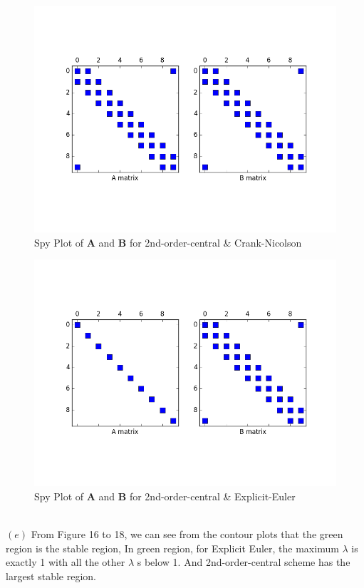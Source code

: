 \documentclass[12pt]{article}
\newenvironment{problem}[2][Problem]{\begin{trivlist}
\item[\hskip \labelsep {\bfseries #1}\hskip \labelsep {\bfseries #2.}]}{\end{trivlist}}
\begin{document}
\begin{problem}{2}
\begin{figure}[H]
  \includegraphics[scale=0.5]{p2d_c2nd_cn.png}
 \caption{Spy Plot of $\mathbf{A}$ and $\mathbf{B}$ for 2nd-order-central \& Crank-Nicolson}
\label{label}
\end{figure}
\begin{figure}[H]
\centering
  \includegraphics[scale=0.5]{p2d_c2nd_ee.png}
 \caption{Spy Plot of $\mathbf{A}$ and $\mathbf{B}$ for 2nd-order-central \& Explicit-Euler}
\label{label}
\end{figure}
\text{}\\
$(e)$
From Figure 16 to 18, we can see from the contour plots that the green region is the stable region, In green region, for Explicit Euler, the maximum $\lambda$ is exactly 1 with all the other $\lambda$ s below 1. And 2nd-order-central scheme has the largest stable region.\\

\end{problem}
\end{document}
